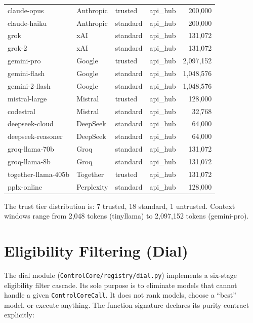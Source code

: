 \documentclass[11pt,a4paper]{article}
\theoremstyle{plain}
\theoremstyle{definition}
\begin{document}
\begin{longtable}{llllr}
claude-opus        & Anthropic & trusted   & api\_hub & 200,000   \\
claude-haiku       & Anthropic & standard  & api\_hub & 200,000   \\
grok               & xAI       & standard  & api\_hub & 131,072   \\
grok-2             & xAI       & standard  & api\_hub & 131,072   \\
gemini-pro         & Google    & trusted   & api\_hub & 2,097,152 \\
gemini-flash       & Google    & standard  & api\_hub & 1,048,576 \\
gemini-2-flash     & Google    & standard  & api\_hub & 1,048,576 \\
mistral-large      & Mistral   & trusted   & api\_hub & 128,000   \\
codestral          & Mistral   & standard  & api\_hub & 32,768    \\
deepseek-cloud     & DeepSeek  & standard  & api\_hub & 64,000    \\
deepseek-reasoner  & DeepSeek  & standard  & api\_hub & 64,000    \\
groq-llama-70b     & Groq      & standard  & api\_hub & 131,072   \\
groq-llama-8b      & Groq      & standard  & api\_hub & 131,072   \\
together-llama-405b& Together  & trusted   & api\_hub & 131,072   \\
pplx-online        & Perplexity& standard  & api\_hub & 128,000   \\
\end{longtable}

The trust tier distribution is: 7 trusted, 18 standard, 1 untrusted. Context
windows range from 2,048 tokens (tinyllama) to 2,097,152 tokens (gemini-pro).

\section{Eligibility Filtering (Dial)}
\label{sec:dial}

The dial module (\texttt{ControlCore/registry/dial.py}) implements a six-stage
eligibility filter cascade. Its sole purpose is to eliminate models that cannot
handle a given \texttt{ControlCoreCall}. It does not rank models, choose a
``best'' model, or execute anything. The function signature declares its purity
contract explicitly:
\end{document}
